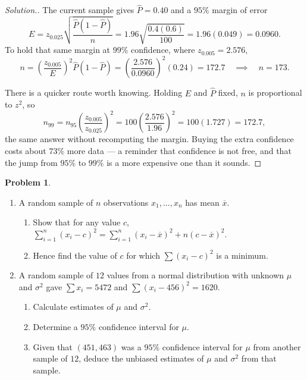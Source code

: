 \documentclass[11pt,a4paper]{article}
\theoremstyle{definition}
\newtheorem{problemx}{Problem}[section]
\newenvironment{problem}{\begin{problemx}}{\end{problemx}}
\newenvironment{solution}
  {\renewcommand{\qedsymbol}{}\begin{proof}[\textit{Solution}.]}
  {\end{proof}}
\begin{document}
\begin{solution}
The current sample gives $\hat{P}=0.40$ and a $95\%$ margin of error
\[E=z_{0.025}\sqrt{\frac{\hat{P}(1-\hat{P})}{n}}=1.96\sqrt{\frac{0.4(0.6)}{100}}=1.96(0.049)=0.0960.\]
To hold that same margin at $99\%$ confidence, where $z_{0.005}=2.576$,
\[n=\left(\frac{z_{0.005}}{E}\right)^2\hat{P}(1-\hat{P})
=\left(\frac{2.576}{0.0960}\right)^2(0.24)=172.7\quad\implies\quad n=173.\]

There is a quicker route worth knowing. Holding $E$ and $\hat{P}$ fixed, $n$ is proportional
to $z^2$, so
\[n_{99}=n_{95}\left(\frac{z_{0.005}}{z_{0.025}}\right)^2=100\left(\frac{2.576}{1.96}\right)^2=100(1.727)=172.7,\]
the same answer without recomputing the margin. Buying the extra confidence costs about
$73\%$ more data --- a reminder that confidence is not free, and that the jump from $95\%$ to
$99\%$ is a more expensive one than it sounds.
\end{solution}

\begin{problem}
\begin{enumerate}
\item[(a).] A random sample of $n$ observations $x_1,\ldots,x_n$ has mean $\overline{x}$.
\begin{enumerate}
\item[(i).] Show that for any value $c$,
$\sum_{i=1}^{n}(x_i-c)^2=\sum_{i=1}^{n}(x_i-\overline{x})^2+n(c-\overline{x})^2$.
\item[(ii).] Hence find the value of $c$ for which $\sum(x_i-c)^2$ is a minimum.
\end{enumerate}
\item[(b).] A random sample of $12$ values from a normal distribution with unknown $\mu$ and
$\sigma^2$ gave $\sum x_i=5472$ and $\sum(x_i-456)^2=1620$.
\begin{enumerate}
\item[(i).] Calculate estimates of $\mu$ and $\sigma^2$.
\item[(ii).] Determine a $95\%$ confidence interval for $\mu$.
\item[(iii).] Given that $(451,463)$ was a $95\%$ confidence interval for $\mu$ from another
sample of $12$, deduce the unbiased estimates of $\mu$ and $\sigma^2$ from that sample.
\end{enumerate}
\end{enumerate}
\end{problem}
\end{document}

